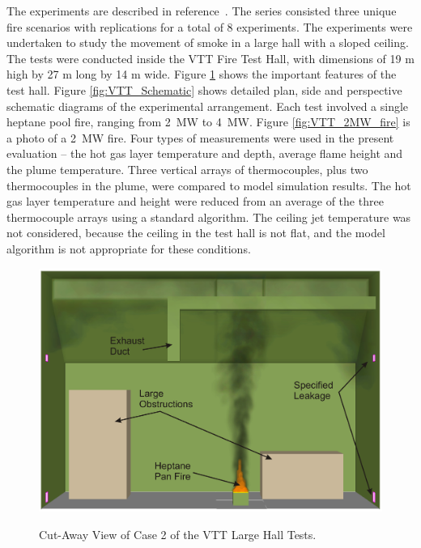 The experiments are described in reference~\cite{Hostikka:2001}. The series consisted three unique fire scenarios with replications for a total of 8 experiments. The experiments were undertaken to study the movement of smoke in a large hall with a sloped ceiling. The tests were conducted inside the VTT Fire Test Hall, with dimensions of 19 m high by 27 m long by 14 m wide. Figure \ref{fig:VTT_cutaway} shows the important features of the test hall. Figure \ref{fig:VTT_Schematic} shows detailed plan, side and perspective schematic diagrams of the experimental arrangement. Each test involved a single heptane pool fire, ranging from 2~MW to 4~MW. Figure \ref{fig:VTT_2MW_fire} is a photo of a 2~MW fire. Four types of measurements were used in the present evaluation -- the hot gas layer temperature and depth, average flame height and the plume temperature. Three vertical arrays of thermocouples, plus two thermocouples in the plume, were compared to model simulation results. The hot gas layer temperature and height were reduced from an average of the three thermocouple arrays using a standard algorithm. The ceiling jet temperature was not considered, because the ceiling in the test hall is not flat, and the model algorithm is not appropriate for these conditions.

\begin{figure}[\figoptions{b}]
\begin{center}
\includegraphics[width=5.0in]{FIGURES/VTT/VTT_Cut_Away}\\
\end{center}
\caption{Cut-Away View of Case 2 of the VTT Large Hall Tests.}
 \label{fig:VTT_cutaway}
\end{figure}

